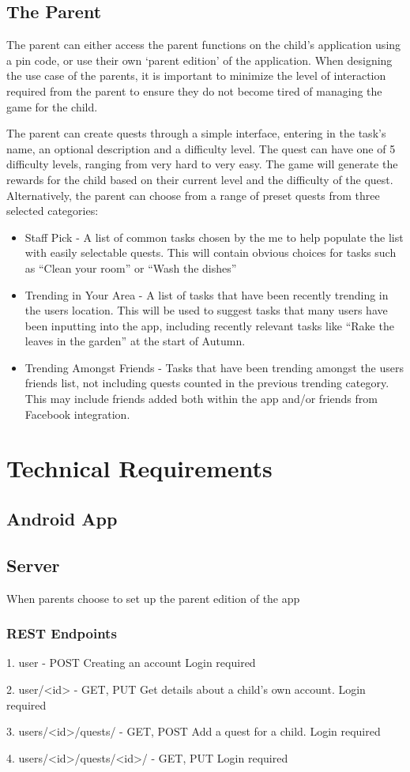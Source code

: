 \subsection{The Parent}
The parent can either access the parent functions on the child's application using a pin code, or use their own `parent edition' of the application. 
When designing the use case of the parents, it is important to minimize the level of interaction required from the parent to ensure they do not become tired of managing the game for the child.

The parent can create quests through a simple interface, entering in the task's name, an optional description and a difficulty level. 
The quest can have one of 5 difficulty levels, ranging from very hard to very easy.
The game will generate the rewards for the child based on their current level and the difficulty of the quest.
Alternatively, the parent can choose from a range of preset quests from three selected categories:
\begin{itemize}
	\item 
		Staff Pick - A list of common tasks chosen by the me to help populate the list with easily selectable quests. 
		This will contain obvious choices for tasks such as ``Clean your room'' or ``Wash the dishes''
	\item
		Trending in Your Area - A list of tasks that have been recently trending in the users location. 
		This will be used to suggest tasks that many users have been inputting into the app, including recently relevant tasks like ``Rake the leaves in the garden'' at the start of Autumn.
	\item 
		Trending Amongst Friends - Tasks that have been trending amongst the users friends list, not including quests counted in the previous 	trending category. 
		This may include friends added both within the app and/or friends from Facebook integration.  
\end{itemize}



\section{Technical Requirements}
\subsection{Android App}

\subsection{Server}
When parents choose to set up the parent edition of the app

\subsubsection{REST Endpoints}
1. user - POST
Creating an account
Login required

2. user/<id> - GET, PUT
Get details about a child's own account.
Login required

3. users/<id>/quests/ - GET, POST
Add a quest for a child.
Login required

4. users/<id>/quests/<id>/ - GET, PUT
Login required